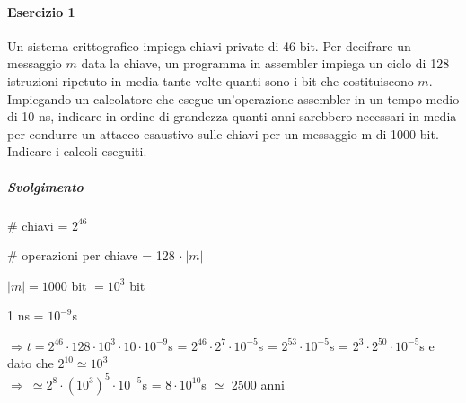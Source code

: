 \documentclass[10pt]{book}
\begin{document}
\paragraph{Esercizio 1} Un sistema crittografico impiega chiavi private di 46 bit. Per decifrare un messaggio $m$ data la
chiave, un programma in assembler impiega un ciclo di 128 istruzioni ripetuto in media tante volte
quanti sono i bit che costituiscono $m$. Impiegando un calcolatore che esegue un'operazione
assembler in un tempo medio di 10 ns, indicare in ordine di grandezza quanti anni sarebbero
necessari in media per condurre un attacco esaustivo sulle chiavi per un messaggio m di 1000 bit.\\
Indicare i calcoli eseguiti.
\subparagraph{Svolgimento} \begin{list}{}{}
	\item \# chiavi = $2^{46}$
	\item \# operazioni per chiave = 128 $\cdot\:|m|$
	\item $|m| = 1000$ bit $= 10^3$ bit
	\item 1 ns = $10^{-9}$s
	\item $\Rightarrow t = 2^{46}\cdot128\cdot10^3\cdot10\cdot10^{-9}$s = $2^{46}\cdot2^7\cdot10^{-5}$s = $2^{53}\cdot10^{-5}$s = $2^3\cdot2^{50}\cdot10^{-5}$s e dato che $2^{10} \simeq 10^3$\\
	$\Rightarrow\:\simeq 2^8\cdot(10^3)^5\cdot10^{-5}$s = $8\cdot10^{10}$s $\simeq$ 2500 anni
\end{list}
\end{document}
